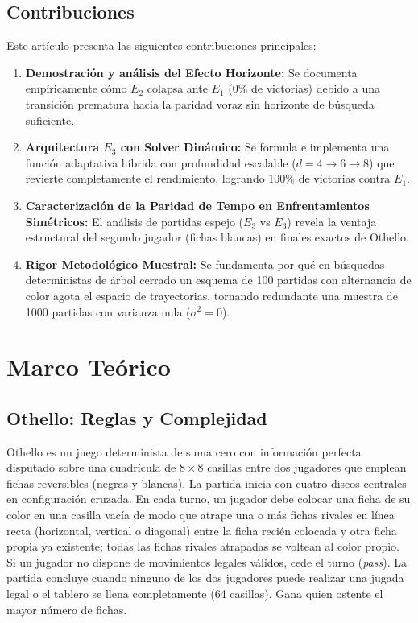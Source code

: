 \documentclass[10pt,a4paper]{article}
\begin{document}
\subsection{Contribuciones}
Este artículo presenta las siguientes contribuciones principales:
\begin{enumerate}
    \item \textbf{Demostración y análisis del Efecto Horizonte:} Se documenta empíricamente cómo $E_2$ colapsa ante $E_1$ ($0\%$ de victorias) debido a una transición prematura hacia la paridad voraz sin horizonte de búsqueda suficiente.
    \item \textbf{Arquitectura $E_3$ con Solver Dinámico:} Se formula e implementa una función adaptativa híbrida con profundidad escalable ($d=4 \to 6 \to 8$) que revierte completamente el rendimiento, logrando $100\%$ de victorias contra $E_1$.
    \item \textbf{Caracterización de la Paridad de Tempo en Enfrentamientos Simétricos:} El análisis de partidas espejo ($E_3$ vs $E_3$) revela la ventaja estructural del segundo jugador (fichas blancas) en finales exactos de Othello.
    \item \textbf{Rigor Metodológico Muestral:} Se fundamenta por qué en búsquedas deterministas de árbol cerrado un esquema de 100 partidas con alternancia de color agota el espacio de trayectorias, tornando redundante una muestra de 1000 partidas con varianza nula ($\sigma^2 = 0$).
\end{enumerate}

\section{Marco Teórico}

\subsection{Othello: Reglas y Complejidad}
Othello es un juego determinista de suma cero con información perfecta disputado sobre una cuadrícula de $8 \times 8$ casillas entre dos jugadores que emplean fichas reversibles (negras y blancas). La partida inicia con cuatro discos centrales en configuración cruzada. En cada turno, un jugador debe colocar una ficha de su color en una casilla vacía de modo que atrape una o más fichas rivales en línea recta (horizontal, vertical o diagonal) entre la ficha recién colocada y otra ficha propia ya existente; todas las fichas rivales atrapadas se voltean al color propio. Si un jugador no dispone de movimientos legales válidos, cede el turno (\textit{pass}). La partida concluye cuando ninguno de los dos jugadores puede realizar una jugada legal o el tablero se llena completamente (64 casillas). Gana quien ostente el mayor número de fichas.
\end{document}
